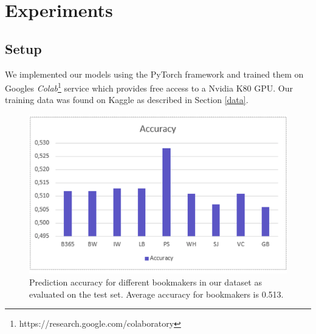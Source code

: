 \documentclass[a4paper]{article}
\begin{document}
\section{Experiments} \label{experiments}
\subsection{Setup}
We implemented our models using the PyTorch framework \cite{PyTorch} and trained
them on Googles
\textit{Colab}\footnote{https://research.google.com/colaboratory} service which
provides free access to a Nvidia K80 GPU. Our training data was found on Kaggle
as described in Section \ref{data}.

\begin{figure} 
\includegraphics[scale=0.40]{img/bmacc.png}
\caption{Prediction accuracy for different bookmakers in our dataset as evaluated on the test set. Average accuracy for bookmakers is 0.513.}
\label{fig:bmacc}
\end{figure}
\end{document}
